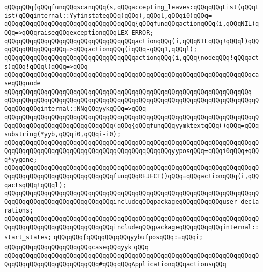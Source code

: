 \verb|qQQqqQQq{qQQqfunqQQqscanqQQq(s,qQQqaccepting_leaves:qQQqqQQqList(qQQqList(qQQqinternal::YyfinstateqQQq)qQQq),qQQql,qQQqi0)qQQq=|\newline
\verb|qQQqqQQqqQQqqQQqqQQqqQQqqQQqqQQqqQQq{qQQqfunqQQqactionqQQq(i,qQQqNIL)qQQq=>qQQqraiseqQQqexceptionqQQqLEX_ERROR;|\newline
\verb|qQQqqQQqqQQqqQQqqQQqqQQqqQQqqQQqqQQqactionqQQq(i,qQQqNILqQQq!qQQql)qQQqqQQqqQQqqQQqqQQq=>qQQqactionqQQq(iqQQq-qQQq1,qQQql);|\newline
\verb|qQQqqQQqqQQqqQQqqQQqqQQqqQQqqQQqqQQqactionqQQq(i,qQQq(nodeqQQq!qQQqacts)qQQq!qQQql)qQQq=>qQQq|\newline
\verb|qQQqqQQqqQQqqQQqqQQqqQQqqQQqqQQqqQQqqQQqqQQqqQQqqQQqqQQqqQQqqQQqqQQqcaseqQQqnode|\newline
\verb|qQQqqQQqqQQqqQQqqQQqqQQqqQQqqQQqqQQqqQQqqQQqqQQqqQQqqQQqqQQqqQQqqQQq|\newline
\verb|qQQqqQQqqQQqqQQqqQQqqQQqqQQqqQQqqQQqqQQqqQQqqQQqqQQqqQQqqQQqqQQqqQQqqQQqqQQqqQQqinternal::NNqQQqyykqQQq=>qQQq|\newline
\verb|qQQqqQQqqQQqqQQqqQQqqQQqqQQqqQQqqQQqqQQqqQQqqQQqqQQqqQQqqQQqqQQqqQQqqQQqqQQqqQQqqQQqqQQqqQQqqQQqqQQq(qQQq{qQQqfunqQQqyymktextqQQq()qQQq=qQQqsubstring(*yyb,qQQqi0,qQQqi-i0);|\newline
\verb|qQQqqQQqqQQqqQQqqQQqqQQqqQQqqQQqqQQqqQQqqQQqqQQqqQQqqQQqqQQqqQQqqQQqqQQqqQQqqQQqqQQqqQQqqQQqqQQqqQQqqQQqqQQqqQQqqQQqyyposqQQq=qQQqi0qQQq+qQQq*yygone;|\newline
\verb|qQQqqQQqqQQqqQQqqQQqqQQqqQQqqQQqqQQqqQQqqQQqqQQqqQQqqQQqqQQqqQQqqQQqqQQqqQQqqQQqqQQqqQQqqQQqqQQqqQQqfunqQQqREJECT()qQQq=qQQqactionqQQq(i,qQQqactsqQQq!qQQql);|\newline
\verb|qQQqqQQqqQQqqQQqqQQqqQQqqQQqqQQqqQQqqQQqqQQqqQQqqQQqqQQqqQQqqQQqqQQqqQQqqQQqqQQqqQQqqQQqqQQqqQQqqQQqincludeqQQqpackageqQQqqQQqqQQquser_declarations;|\newline
\verb|qQQqqQQqqQQqqQQqqQQqqQQqqQQqqQQqqQQqqQQqqQQqqQQqqQQqqQQqqQQqqQQqqQQqqQQqqQQqqQQqqQQqqQQqqQQqqQQqqQQqincludeqQQqpackageqQQqqQQqqQQqinternal::start_states;|\newline
\verb|qQQqqQQq{qQQqqQQqqQQqyybufposqQQq:=qQQqi;|\newline
\verb|qQQqqQQqqQQqqQQqqQQqqQQqcaseqQQqyyk|\newline
\verb|qQQq|\newline
\newline
\verb|qQQqqQQqqQQqqQQqqQQqqQQqqQQqqQQqqQQqqQQqqQQqqQQqqQQqqQQqqQQqqQQqqQQqqQQqqQQqqQQqqQQqqQQqqQQqqQQq#qQQqqQQqApplicationqQQqactionsqQQq|\newline
